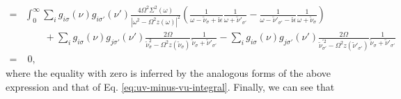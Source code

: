 \begin{equation}
\begin{split}
= &\int_0^\infty\sum_ig_{i\sigma}(\nu)g_{i\sigma'}(\nu')\frac{4\Omega^2\Sigma^2(\omega)}{|\omega^2 - \Omega^2z(\omega)|^2}\left(\frac{1}{\omega - \tilde{\nu}_\sigma + \mathrm{i}\epsilon}\frac{1}{\omega + \tilde{\nu}'_{\sigma'}} - \frac{1}{\omega - \tilde{\nu}'_{\sigma'} - \mathrm{i}\epsilon}\frac{1}{\omega + \tilde{\nu}_\sigma}\right)\\
&\qquad + \sum_ig_{i\sigma}(\nu)g_{j\sigma'}(\nu')\frac{2\Omega}{\tilde{\nu}_\sigma^2 - \Omega^2z(\tilde{\nu}_\sigma)}\frac{1}{\tilde{\nu}_\sigma + \tilde{\nu}'_{\sigma'}} - \sum_ig_{i\sigma}(\nu)g_{j\sigma'}(\nu')\frac{2\Omega}{\tilde{\nu}_{\sigma'}^{\prime2} - \Omega^2z(\tilde{\nu}'_{\sigma'})}\frac{1}{\tilde{\nu}_\sigma + \tilde{\nu}'_{\sigma'}}\\
= &\;0,
\end{split}
\end{equation}
where the equality with zero is inferred by the analogous forms of the above expression and that of Eq. \eqref{eq:uv-minus-vu-integral}. Finally, we can see that
